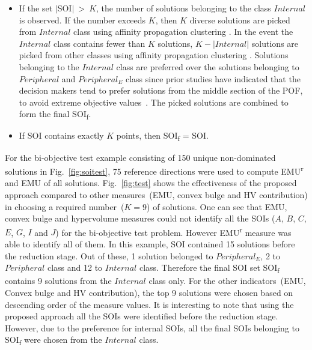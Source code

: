 \begin{itemize}
	\item If the set $|$SOI$|~>~K$, the number of solutions belonging to the class $Internal$ is observed. If the number exceeds $K$, then $K$ diverse solutions are picked from $Internal$ class using affinity propagation clustering \cite{apcluster2011}. In the event the $Internal$ class contains fewer than $K$ solutions, $K - |Internal|$ solutions are picked from other classes using affinity propagation clustering \cite{apcluster2011}. Solutions belonging to the $Internal$ class are preferred over the solutions belonging to $Peripheral$ and $Peripheral_E$ class since prior studies have indicated that the decision makers tend to prefer solutions from the middle section of the POF, to avoid extreme objective values~\cite{das_characterizing_1999}. The picked solutions are combined to form the final SOI\textsubscript{f}.
	
	\item If SOI contains exactly $K$ points, then SOI\textsubscript{f} = SOI.
\end{itemize}

For the bi-objective test example consisting of 150 unique non-dominated solutions in Fig.~\ref{fig:soitest}, 75 reference directions were used to compute EMU\textsuperscript{r} and EMU of all solutions. Fig.~\ref{fig:test} shows the effectiveness of the proposed approach compared to other measures~(EMU, convex bulge and HV contribution) in choosing a required number~($K=9$) of solutions. One can see that EMU, convex bulge and hypervolume measures could not identify all the SOIs ($A$, $B$, $C$, $E$, $G$, $I$ and $J$) for the bi-objective test problem. However EMU\textsuperscript{r} measure was able to identify all of them. In this example, SOI contained 15 solutions before the reduction stage. Out of these, 1 solution belonged to $Peripheral_E$, 2 to $Peripheral$ class and 12 to $Internal$ class. Therefore the final SOI set SOI\textsubscript{f} contains 9 solutions from the $Internal$ class only. For the other indicators~(EMU, Convex bulge and HV contribution), the top 9 solutions were chosen based on descending order of the measure values. It is interesting to note that using the proposed approach all the SOIs were identified before the reduction stage. However, due to the preference for internal SOIs, all the final SOIs belonging to SOI\textsubscript{f} were chosen from the $Internal$ class. 

\begin{figure*}[!htb]
	\centering    
	\quad
	\quad
	\quad
	\quad      
	\caption{Bi-objective test example: (a) EMU\textsuperscript{r}, (b) EMU, (c) Convex Bulge, (d) HV contribution}
	\label{fig:test}
\end{figure*}


